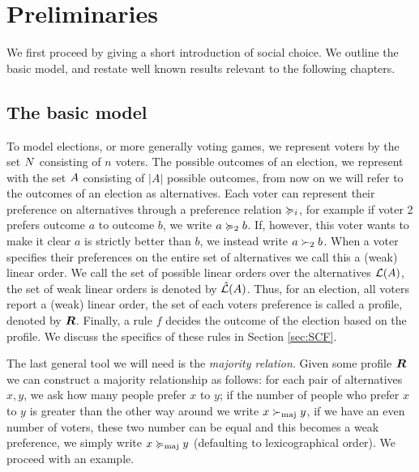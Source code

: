 \chapter{Preliminaries}
\label{chap: preliminaries}
We first proceed by giving a short introduction of social choice. We outline the basic model, and restate well known results relevant to the following chapters.

\section{The basic model}
To model elections, or more generally voting games, we represent voters by the set $N$ consisting of $n$ voters. The possible outcomes of an election, we represent with the set $A$ consisting of $|A|$ possible outcomes, from now on we will refer to the outcomes of an election as alternatives. Each voter can represent their preference on alternatives through a preference relation $\succcurlyeq_i$, for example if voter 2 prefers outcome $a$ to outcome $b$, we write $a \succcurlyeq_2 b$. If, however, this voter wants to make it clear $a$ is strictly better than $b$, we instead write $a \succ_2 b$. When a voter specifies their preferences on the entire set of alternatives we call this a (weak) linear order. We call the set of possible linear orders over the alternatives $\mathcal{L}(A)$, the set of weak linear orders is denoted by $\hat{\mathcal{L}}(A)$. Thus, for an election, all voters report a (weak) linear order, the set of each voters preference is called a profile, denoted by $\boldsymbol{R}$. Finally, a rule $f$ decides the outcome of the election based on the profile. We discuss the specifics of these rules in Section \cref{sec:SCF}.

The last general tool we will need is the \emph{majority relation}. Given some profile $\boldsymbol{R}$ we can construct a majority relationship as follows: for each pair of alternatives $x,y$, we ask how many people prefer $x$ to $y$; if the number of people who prefer $x$ to $y$ is greater than the other way around we write $x  \succ_{\textnormal{maj}} y$, if we have an even number of voters, these two number can be equal and this becomes a weak preference, we simply write $x \succcurlyeq_{\textnormal{maj}} y$ (defaulting to lexicographical order). We proceed with an example.

